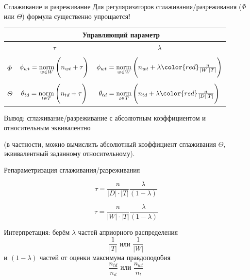 \begin{frame}{Сглаживание и разреживание}
Для регуляризаторов сглаживания/разреживания ($\Phi$ или $\Theta$) формула существенно упрощается!

\begin{table}[]
\begin{tabular}{l|c|c|}
         & \multicolumn{2}{c}{Управляющий параметр}                                                                                                      \\ \hline
         & $\tau$                                          & $\lambda$                                                                                   \\ \hline 
         &    &          \\[-5pt]
$\Phi$   & $\phi_{wt} = \mathop{\mathrm{norm}}\limits_{w \in W}\Bigg(n_{wt} + \tau\Bigg)$    & $\phi_{wt} = \norm_{w \in W}\Bigg(n_{wt} + \lambda {\color{red}\frac{n}{|W||T|}}\Bigg)$    \\[15pt] \hline
         &    &          \\[-5pt]
$\Theta$ & $\theta_{td} = \mathop{\mathrm{norm}}\limits_{t \in T} \Bigg(n_{td} + \tau\Bigg)$ & $\theta_{td} = \norm_{t \in T} \Bigg(n_{td} + \lambda {\color{red}\frac{n}{|D| |T|}}\Bigg)$ \\[15pt]  \hline
\end{tabular}
\end{table}
Вывод: сглаживание/разреживание с абсолютным коэффициентом и относительным эквивалентно 

\smallskip
(в частности, можно вычислить абсолютный коэффициент сглаживания $\Theta$, эквивалентный заданному относительному).

\end{frame}

\begin{frame}{Репараметризация сглаживания/разреживания}
	
\begin{equation}
\tau = \frac{n}{|D| \cdot |T|} \frac{\lambda}{(1-\lambda)}
\end{equation}

\begin{equation}
\tau = \frac{n}{|W|\cdot|T|} \frac{\lambda}{(1-\lambda)}  
\end{equation}

Интерпретация: берём $\lambda$ частей априорного распределения
\[
\frac{1}{|T|}\text{ или }\frac{1}{|W|}
\]
и $(1-\lambda)$ частей от оценки максимума правдоподобия 
\[
\frac{n_{td}}{n_d}\text{ или }\frac{n_{wt}}{n_t}
\]

\end{frame}

